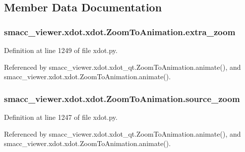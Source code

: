 \subsection{Member Data Documentation}
\subsubsection[{\texorpdfstring{extra\+\_\+zoom}{extra_zoom}}]{\setlength{\rightskip}{0pt plus 5cm}smacc\+\_\+viewer.\+xdot.\+xdot.\+Zoom\+To\+Animation.\+extra\+\_\+zoom}\hypertarget{classsmacc__viewer_1_1xdot_1_1xdot_1_1ZoomToAnimation_a77a1b495b0e59070847457f11f8ade53}{}\label{classsmacc__viewer_1_1xdot_1_1xdot_1_1ZoomToAnimation_a77a1b495b0e59070847457f11f8ade53}


Definition at line 1249 of file xdot.\+py.



Referenced by smacc\+\_\+viewer.\+xdot.\+xdot\+\_\+qt.\+Zoom\+To\+Animation.\+animate(), and smacc\+\_\+viewer.\+xdot.\+xdot.\+Zoom\+To\+Animation.\+animate().

\subsubsection[{\texorpdfstring{source\+\_\+zoom}{source_zoom}}]{\setlength{\rightskip}{0pt plus 5cm}smacc\+\_\+viewer.\+xdot.\+xdot.\+Zoom\+To\+Animation.\+source\+\_\+zoom}\hypertarget{classsmacc__viewer_1_1xdot_1_1xdot_1_1ZoomToAnimation_af0fc17c1b5ec4e90e75cd3bc47ddbc81}{}\label{classsmacc__viewer_1_1xdot_1_1xdot_1_1ZoomToAnimation_af0fc17c1b5ec4e90e75cd3bc47ddbc81}


Definition at line 1247 of file xdot.\+py.



Referenced by smacc\+\_\+viewer.\+xdot.\+xdot\+\_\+qt.\+Zoom\+To\+Animation.\+animate(), and smacc\+\_\+viewer.\+xdot.\+xdot.\+Zoom\+To\+Animation.\+animate().

